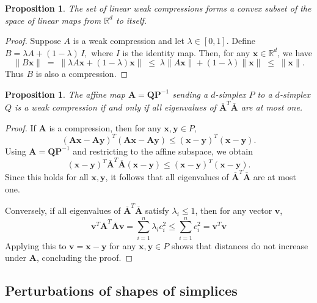 \documentclass[a4paper, 12pt]{amsart}
\theoremstyle{plain}
\newtheorem{Prop}[Thm]{Proposition}
\begin{document}
\begin{Prop}  
The set of linear weak compressions forms a convex subset of the space of linear maps from $\mathbb{R}^d$ to itself.
\end{Prop}

\begin{proof}
Suppose $A$ is a weak compression and let $\lambda \in [0,1]$.
Define 
$
B =\lambda A +(1 - \lambda)\,I,
$
where $I$ is the identity map. Then, for any \(\mathbf{x} \in \mathbb{R}^d\), we have
$$
\|B\mathbf{x}\| \;=\; \|\lambda A \mathbf{x} + (1-\lambda)\mathbf{x}\|
\;\le\; \lambda \|A \mathbf{x}\| + (1-\lambda)\|\mathbf{x}\| \;\le\; \|\mathbf{x}\|.
$$
Thus $B$ is also a compression.
\end{proof}

\begin{Prop}\label{evallesseq1}
The affine map $\mathbf{A} = \mathbf{Q} \mathbf{P}^{-1}$ sending a $d$-simplex ${P}$ to a $d$-simplex ${Q}$ is a weak compression if and only if all eigenvalues of $\overline{\mathbf{A}}^T \overline{\mathbf{A}}$ are at most one.
\end{Prop} 
\begin{proof}

If $\mathbf{A}$ is a compression, then for any $\mathbf{x}, \mathbf{y} \in {P}$,
$$
(\mathbf{A} \mathbf{x} - \mathbf{A} \mathbf{y})^T (\mathbf{A} \mathbf{x} - \mathbf{A} \mathbf{y}) \leq (\mathbf{x} - \mathbf{y})^T (\mathbf{x} - \mathbf{y}).
$$
Using $\mathbf{A} = \mathbf{Q} \mathbf{P}^{-1}$ and restricting to the affine subspace, we obtain
$$
(\mathbf{x} - \mathbf{y})^T \overline{\mathbf{A}}^T \overline{\mathbf{A}} (\mathbf{x} - \mathbf{y}) \leq (\mathbf{x} - \mathbf{y})^T (\mathbf{x} - \mathbf{y}).
$$
Since this holds for all $\mathbf{x}, \mathbf{y}$, it follows that all eigenvalues of $\overline{\mathbf{A}}^T \overline{\mathbf{A}}$ are at most one.

Conversely, if all eigenvalues of $\overline{\mathbf{A}}^T \overline{\mathbf{A}}$ satisfy $\lambda_i \leq 1$, then for any vector $\mathbf{v}$,
$$
\mathbf{v}^T \overline{\mathbf{A}}^T \overline{\mathbf{A}} \mathbf{v} 
= \sum_{i=1}^{n} \lambda_i c_i^2 \leq \sum_{i=1}^{n} c_i^2 = \mathbf{v}^T \mathbf{v}
$$
Applying this to $\mathbf{v} = \mathbf{x} - \mathbf{y}$ for any $\mathbf{x}, \mathbf{y} \in {P}$ shows that distances do not increase under $\mathbf{A}$, concluding the proof.
\end{proof}

\subsection{Perturbations of shapes of simplices}
\end{document}
